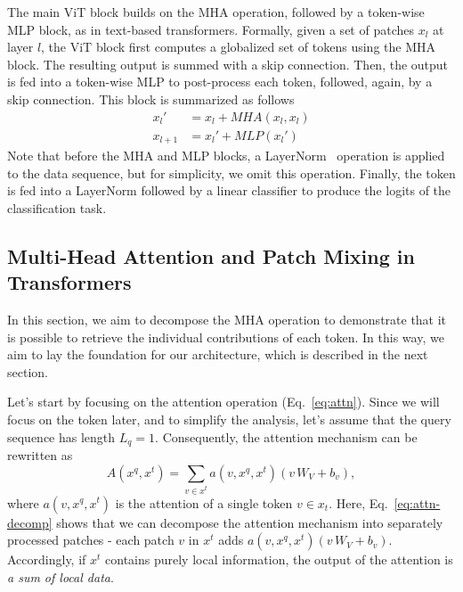 The main ViT block builds on the MHA operation, followed by a token-wise MLP block, as in text-based transformers. 
Formally, given a set of patches $x_l$ at layer $l$, the ViT block first computes a globalized set of tokens using the MHA block. 
The resulting output is summed with a skip connection. 
Then, the output is fed into a token-wise MLP to post-process each token, followed, again, by a skip connection.
This block is summarized as follows
\begin{equation}\label{eq:vit-block}
\begin{split}
    x_{l}' &= x_l + MHA(x_l, x_l) \\
    x_{l+1} &= x_l' + MLP(x_l')
\end{split}
\end{equation}
Note that before the MHA and MLP blocks, a LayerNorm~\cite{ba2016layer} operation is applied to the data sequence, but for simplicity, we omit this operation.
Finally, the \CLS token is fed into a LayerNorm followed by a linear classifier to produce the logits of the classification task.

\subsection{Multi-Head Attention and Patch Mixing in Transformers}\label{sec:mha}


In this section, we aim to decompose the MHA operation to demonstrate that it is possible to retrieve the individual contributions of each token. In this way, we aim to lay the foundation for our architecture, which is described in the next section. 

Let's start by focusing on the attention operation (Eq.~\ref{eq:attn}). Since we will focus on the \CLS token later, and to simplify the analysis, let's assume that the query sequence has length $L_q=1$. 
Consequently, the attention mechanism can be rewritten as
\begin{equation}\label{eq:attn-decomp}
    A(x^q, x^t) = \sum_{v\in x^t} a(v, x^q, x^t)(v\,W_V + b_v),
\end{equation}
where $a(v, x^q, x^t)$ is the attention of a single token $v\in x_t$. Here, Eq.~\ref{eq:attn-decomp} shows that we can decompose the attention mechanism into separately processed patches - each patch $v$ in $x^t$ adds $a(v, x^q, x^t)(v\,W_V + b_v)$. Accordingly, if $x^t$ contains purely local information, the output of the attention is \emph{a sum of local data}.


